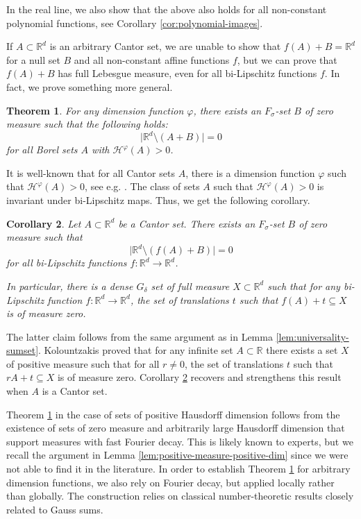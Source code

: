 \documentclass[12pt]{amsart}
\renewcommand{\phi}{\varphi}
\newtheorem{theorem}{Theorem}
\newtheorem{corollary}[theorem]{Corollary}
\def\R{{\mathbb{R}}}
\numberwithin{theorem}{section}
\numberwithin{equation}{section}
\begin{document}
In the real line, we also show that the above also holds for all non-constant polynomial functions, see Corollary \ref{cor:polynomial-images}.

If $A\subset\R^d$ is an arbitrary Cantor set, we are unable to show that $f(A)+B=\R^d$ for a null set $B$ and all non-constant affine functions $f$, but we can prove that $f(A)+B$ has full Lebesgue measure, even for all bi-Lipschitz functions $f$. In fact, we prove something more general.
\begin{theorem} \label{thm:full-measure-sumset}
    For any dimension function $\phi$, there exists an $F_\sigma$-set $B$ of zero measure such that the following holds:
    \[
        \bigl|\R^d\setminus (A+B)\bigr| = 0
    \]
    for all Borel sets $A$ with $\mathcal{H}^\phi(A)>0$.
\end{theorem}

It is well-known that for all Cantor sets $A$, there is a dimension function $\phi$ such that $\mathcal{H}^\phi(A)>0$, see e.g. \cite[Theorem 35]{Rogers70}. The class of sets $A$ such that $\mathcal{H}^{\phi}(A)>0$ is invariant under bi-Lipschitz maps. Thus, we get the following corollary.
\begin{corollary} \label{cor:full-measure-sumset}
    Let $A\subset\R^d$ be a Cantor set. There exists an $F_\sigma$-set $B$ of zero measure such that
    \[
        \bigl|\R^d\setminus (f(A)+B)\bigr| = 0
    \]
    for all bi-Lipschitz functions $f:\R^d\to \R^d$.

    In particular, there is a dense $G_\delta$ set of full measure $X\subset\R^d$ such that for any bi-Lipschitz function $f:\R^d\to \R^d$, the set of translations $t$ such that $f(A)+t\subseteq X$ is of measure zero.
\end{corollary}
The latter claim follows from the same argument as in Lemma \ref{lem:universality-sumset}. Kolountzakis \cite{Kolountzakis97} proved that for any infinite set $A\subset\R$ there exists a set $X$ of positive measure such that for all $r\neq 0$, the set of translations $t$ such that $rA+t\subseteq X$ is of measure zero. Corollary \ref{cor:full-measure-sumset} recovers and strengthens this result when $A$ is a Cantor set.


Theorem \ref{thm:full-measure-sumset} in the case of sets of positive Hausdorff dimension follows from the existence of sets of zero measure and arbitrarily large Hausdorff dimension that support measures with fast Fourier decay. This is likely known to experts, but we recall the argument in Lemma \ref{lem:positive-measure-positive-dim} since we were not able to find it in the literature. In order to establish Theorem \ref{thm:full-measure-sumset} for arbitrary dimension functions, we also rely on Fourier decay, but applied locally rather than globally. The construction relies on classical number-theoretic results closely related to Gauss sums.
\end{document}
